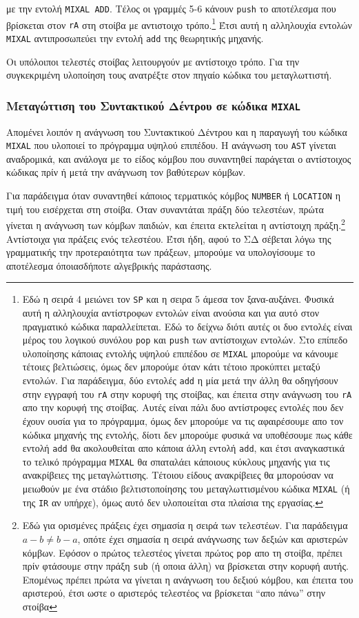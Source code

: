 \documentclass[a4paper,11pt]{article}
\newcommand{\tech}[1]{\foreignlanguage{english}{\texttt{#1}}}
\begin{document}
με την εντολή \tech{MIXAL ADD}. Τέλος οι γραμμές 5-6 κάνουν \tech{push} το αποτέλεσμα
που βρίσκεται στον \tech{rA} στη στοίβα με αντιστοιχο τρόπο.\footnote{
	Εδώ η σειρά 4 μειώνει τον \tech{SP} και η σειρα 5 άμεσα τον ξανα-αυξάνει. Φυσικά 
	αυτή η αλληλουχία αντίστροφων εντολών είναι ανούσια και για αυτό στον πραγματικό κώδικα
	παραλλείπεται. Εδώ το δείχνω διότι αυτές οι δυο εντολές είναι μέρος του λογικού
	συνόλου \tech{pop} και \tech{push} των αντίστοιχων εντολών.
	Στο επίπεδο υλοποίησης κάποιας εντολής υψηλού επιπέδου σε \tech{MIXAL} μπορούμε
	να κάνουμε τέτοιες βελτιώσεις, όμως δεν μπορούμε όταν κάτι τέτοιο προκύπτει
	μεταξύ εντολών. Για παράδειγμα, δύο εντολές \tech{add} η μία μετά την άλλη
	θα οδηγήσουν στην εγγραφή του \tech{rA} στην κορυφή της στοίβας, και έπειτα
	στην ανάγνωση του \tech{rA} απο την κορυφή της στοίβας. Αυτές είναι πάλι
	δυο αντίστροφες εντολές που δεν έχουν ουσία για το πρόγραμμα, όμως δεν μπορούμε 
	να τις αφαιρέσουμε απο τον κώδικα μηχανής της εντολής, δίοτι δεν μπορούμε 
	φυσικά να υποθέσουμε πως κάθε εντολή \tech{add} θα ακολουθείται απο
	κάποια άλλη εντολή \tech{add}, και έτσι αναγκαστικά το τελικό πρόγραμμα 
	\tech{MIXAL} θα σπαταλάει κάποιους κύκλους μηχανής για τις ανακρίβειες της μεταγλώττισης. 
	Τέτοιου είδους ανακρίβειες θα μπορούσαν να μειωθούν με ένα στάδιο βελτιστοποίησης 
	του μεταγλωττισμένου κώδικα \tech{MIXAL} (ή της \tech{IR} αν υπήρχε), 
	όμως αυτό δεν υλοποιείται στα πλαίσια της εργασίας.
} Έτσι αυτή η αλληλουχία εντολών \tech{MIXAL} αντιπροσωπεύει την εντολή \tech{add} 
της θεωρητικής μηχανής.

Οι υπόλοιποι τελεστές στοίβας λειτουργούν με αντίστοιχο τρόπο. Για την συγκεκριμένη υλοποίηση
τους ανατρέξτε στον πηγαίο κώδικα του μεταγλωττιστή.

\subsubsection{Μεταγώττιση του Συντακτικού Δέντρου σε κώδικα \tech{MIXAL}}
Απομένει λοιπόν η ανάγνωση του Συντακτικού Δέντρου και η παραγωγή του κώδικα \tech{MIXAL}
που υλοποιεί το πρόγραμμα υψηλού επιπέδου. Η ανάγνωση του \tech{AST} γίνεται αναδρομικά,
και ανάλογα με το είδος κόμβου που συναντηθεί παράγεται ο αντίστοιχος κώδικας πρίν ή μετά
την ανάγνωση τον βαθύτερων κόμβων.

Για παράδειγμα όταν συναντηθεί κάποιος τερματικός κόμβος \tech{NUMBER} ή \tech{LOCATION}
η τιμή του εισέρχεται στη στοίβα. Όταν συναντάται πράξη δύο τελεστέων, πρώτα γίνεται η
ανάγνωση των κόμβων παιδιών, και έπειτα εκτελείται η αντίστοιχη πράξη.\footnote{
	Εδώ για ορισμένες πράξεις έχει σημασία η σειρά των τελεστέων. Για παράδειγμα 
	\(a - b \neq b - a\), οπότε έχει σημασία η σειρά ανάγνωσης των δεξιών και αριστερών
	κόμβων. Εφόσον ο πρώτος τελεστέος γίνεται πρώτος \tech{pop} απο τη στοίβα, πρέπει
	πρίν φτάσουμε στην πράξη \tech{sub} (ή οποια άλλη) να βρίσκεται στην κορυφή αυτής.
	Επομένως πρέπει πρώτα να γίνεται η ανάγνωση του δεξιού κόμβου, και έπειτα του αριστερού,
	έτσι ωστε ο αριστερός τελεστέος να βρίσκεται \enquote{απο πάνω} στην στοίβα
} Αντίστοιχα για πράξεις ενός τελεστέου. Έτσι ήδη, αφού το ΣΔ σέβεται λόγω της γραμματικής
την προτεραιότητα των πράξεων, μπορούμε να υπολογίσουμε το αποτέλεσμα όποιασδήποτε 
αλγεβρικής παράστασης.
\end{document}
